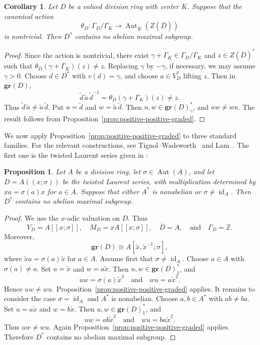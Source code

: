 \documentclass[11pt]{amsart}
\newtheorem{proposition}[theorem]{Proposition}
\newtheorem{corollary}[theorem]{Corollary}
\theoremstyle{definition}
\newcommand{\Aut}{\operatorname{Aut}}
\begin{document}
\begin{corollary}
\label{cor:canonical-action}
Let \(D\) be a valued division ring with center \(K\). Suppose that the
canonical action
\[
        \theta_D:\Gamma_D/\Gamma_K
        \longrightarrow
        \Aut_{\overline K}(Z(\overline D))
\]
is nontrivial. Then \(D^*\) contains no abelian maximal subgroup.
\end{corollary}

\begin{proof}
Since the action is nontrivial, there exist
$\gamma+\Gamma_K\in\Gamma_D/\Gamma_K$ and $z\in Z(\overline D)^*$ such that
$\theta_D(\gamma+\Gamma_K)(z)\ne z$. Replacing $\gamma$ by $-\gamma$, if
necessary, we may assume $\gamma>0$. Choose $d\in D^*$ with $v(d)=\gamma$,
and choose $a\in V_D^*$ lifting $z$. Then in $\mathbf{gr}(D)$,
\[
        \widetilde d\,\widetilde a\,\widetilde d^{-1}
        =
        \theta_D(\gamma+\Gamma_K)(z)
        \ne z.
\]
Thus $\widetilde d\,\widetilde a\ne \widetilde a\,\widetilde d$. Put
$u=\widetilde d$ and $w=\widetilde a\,\widetilde d$. Then
$u,w\in \mathbf{gr}(D)_\gamma^*$, and $uw\ne wu$. The result follows from
Proposition~\ref{prop:positive-positive-graded}.
\end{proof}

We now apply Proposition~\ref{prop:positive-positive-graded} to three
standard families.   For the relevant constructions, see Tignol--Wadsworth~\cite[Sections~1.1.3--1.1.4]{TW} and Lam~\cite[Section~14]{L}. The first one is the twisted Laurent series given in \cite[§1.1.2, pp.~3--4]{TW}:

\begin{proposition}
\label{prop:twisted-laurent}
Let $A$ be a division ring, let $\sigma\in\operatorname{Aut}(A)$, and let
$D=A((x;\sigma))$ be the twisted Laurent series, with multiplication determined by $xa=\sigma(a)x$ for
$a\in A$. Suppose that either $A^*$ is nonabelian or
$\sigma\ne\operatorname{id}_A$. Then $D^*$ contains no abelian maximal
subgroup.
\end{proposition}

\begin{proof}
We use the $x$-adic valuation on $D$. Thus
$$
        V_D=A[[x;\sigma]],\quad
        M_D=xA[[x;\sigma]],\quad
        \overline D=A,\quad\text{and}\quad
        \Gamma_D=\mathbb Z.
$$
Moreover,
\[
        \mathbf{gr}(D)\cong A[\widetilde x,\widetilde x^{-1};\sigma],
\]
where $\widetilde x a=\sigma(a)\widetilde x$ for $a\in A$.
Assume first that $\sigma\ne\operatorname{id}_A$. Choose $a\in A$ with
$\sigma(a)\ne a$. Set $u=\widetilde x$ and $w=a\widetilde x$. Then
$u,w\in \mathbf{gr}(D)_1^*$, and
\[
        uw=\sigma(a)\widetilde x^2
        \quad\text{and}\quad
        wu=a\widetilde x^2.
\]
Hence $uw\ne wu$. Proposition~\ref{prop:positive-positive-graded} applies.
It remains to consider the case $\sigma=\operatorname{id}_A$ and $A^*$ is
nonabelian. Choose $a,b\in A^*$ with $ab\ne ba$. Set
$u=a\widetilde x$ and $w=b\widetilde x$. Then
$u,w\in \mathbf{gr}(D)_1^*$, and
\[
        uw=ab\widetilde x^2
        \quad\text{and}\quad
        wu=ba\widetilde x^2.
\]
Thus $uw\ne wu$. Again Proposition~\ref{prop:positive-positive-graded}
applies. Therefore $D^*$ contains no abelian maximal subgroup.
\end{proof}
\end{document}
